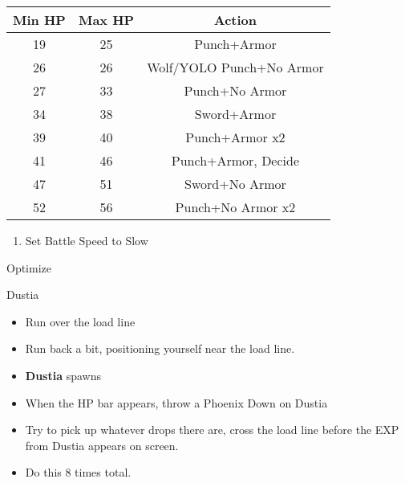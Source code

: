 \begin{center}
	\begin{tabular}{|c|c|c|} \hline
		Min HP & Max HP & Action                   \\ \hline
		19     & 25     & Punch+Armor              \\ \hline
		26     & 26     & Wolf/YOLO Punch+No Armor \\ \hline
		27     & 33     & Punch+No Armor           \\ \hline
		34     & 38     & Sword+Armor              \\ \hline
		39     & 40     & Punch+Armor x2           \\ \hline
		41     & 46     & Punch+Armor, Decide      \\ \hline
		47     & 51     & Sword+No Armor           \\ \hline
		52     & 56     & Punch+No Armor x2        \\ \hline
	\end{tabular}
\end{center}
\begin{enumerate}
	\item Set Battle Speed to Slow
\end{enumerate}
\begin{equip}
	\begin{itemize}
		\vaanf Optimize
	\end{itemize}
\end{equip}
\begin{battle}{Dustia}
	\begin{itemize}
		\item Run over the load line
		\item Run back a bit, positioning yourself near the load line.
		\item \textbf{Dustia} spawns
		\item When the HP bar appears, throw a Phoenix Down on Dustia
		\item Try to pick up whatever drops there are, cross the load line before the EXP from Dustia appears on screen.
		\item Do this 8 times total.
	\end{itemize}
\end{battle}
